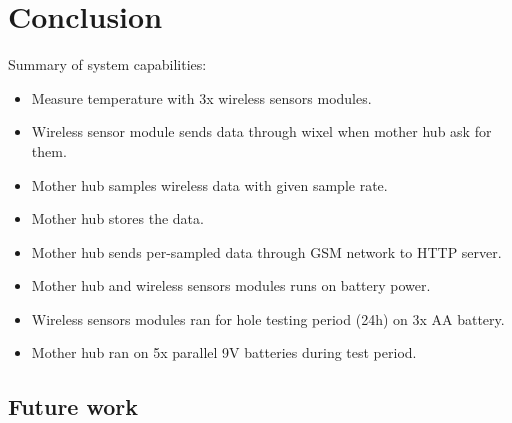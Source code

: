 \section{Conclusion}
Summary of system capabilities:
\begin{itemize}
	\item Measure temperature with 3x wireless sensors modules.
	\item Wireless sensor module sends data through wixel when mother hub ask for them.
	\item Mother hub samples wireless data with given sample rate.
	\item Mother hub stores the data.
	\item Mother hub sends per-sampled data through GSM network to HTTP server.
	\item Mother hub and wireless sensors modules runs on battery power.
	\item Wireless sensors modules ran for hole testing period (24h) on 3x AA battery.
	\item Mother hub ran on 5x parallel 9V batteries during test period.
\end{itemize}
 
\subsection{Future work}


